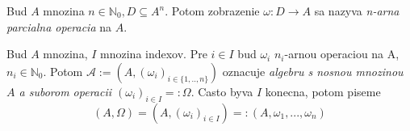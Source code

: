 \documentclass[12pt]{article}
\begin{document}
Bud $A$ mnozina $n \in \mathbb{N}_{0}, D \subseteq A^{n}$. Potom zobrazenie
$\omega: D \to A$ sa nazyva \emph{n-arna parcialna operacia} na $A$.

Bud $A$ mnozina, $I$ mnozina indexov. Pre $i \in I$ bud $\omega_{i}$ $n_{i}$-arnou operaciou na A,
$n_{i} \in \mathbb{N}_{0}$. Potom $\mathcal{A} := (A, (\omega_{i})_{i \in \{1,..,n\}})$ oznacuje
\emph{algebru s nosnou mnozinou $A$ a suborom operacii $(\omega_{i})_{i \in I} =: \Omega$}.
Casto byva $I$ konecna, potom piseme
\begin{equation*}
	(A,\Omega) = (A, (\omega_{i})_{i \in I}) =: (A, \omega_{1},...,\omega_{n})
\end{equation*}
\end{document}
